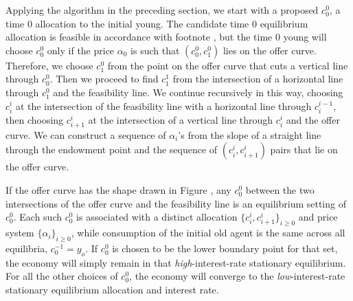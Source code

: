 Applying the algorithm in the preceding section, we start with
a proposed $c_0^0$, a time $0$ allocation to the initial young.
The candidate time $0$ equilibrium allocation is feasible in 
accordance with footnote , but  the
time $0$  young will choose $c_0^0$ only if the price $\alpha_0$ is such that
$(c^0_0, c^0_1)$ lies
on the offer curve.      Therefore, we choose $c^0_1$ from
the point on the offer curve that cuts a vertical
line through  $c^0_0$.   Then we proceed to find $c^1_1$ from
the intersection of a horizontal line through $c^0_1$
and the  feasibility line.   We continue recursively in this way,
choosing $c_i^i$ at the intersection of the feasibility line
with a horizontal line through $c^{i-1}_i$, then
choosing $c_{i+1}^i$ at the intersection of a vertical
line through $c_i^i$   and the offer curve.    We can
construct a sequence of $\alpha_i$'s from the slope
of a straight line through the endowment point
and the sequence of $(c_i^i, c^i_{i+1})$  pairs that
lie on the offer curve.

 If the offer curve has the shape drawn in Figure , any %
$c_0^0$ between the 
two intersections
of the offer curve and the feasibility line is
an equilibrium setting of $c_0^0$. Each such $c_0^0$ is
associated with a distinct allocation 
$\{c^i_i, c^i_{i+1}\}_{i\geq 0}$ and
price system $\{\alpha_i\}_{i\geq 0}$, while  
consumption of the initial old agent is the
same across all equilibria, $c^{-1}_0 = y_o$.
If $c^0_0$ is chosen to be the lower boundary
point for that set, the economy will simply 
remain in that {\it high\/}-interest-rate stationary 
equilibrium. For all the other choices of $c^0_0$,
the economy will converge to the {\it low\/}-interest-rate
stationary equilibrium allocation and interest rate.



